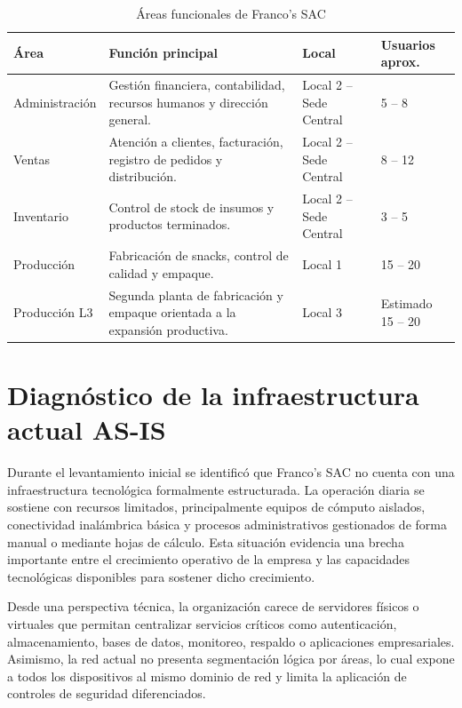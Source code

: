 \documentclass[11pt, a4paper, oneside]{report}
\begin{document}
\begin{table}[htbp]
\centering
\caption{Áreas funcionales de Franco's SAC}
\small
\renewcommand{\arraystretch}{1.25}
\begin{tabularx}{\textwidth}{|M{3.2cm}|X|L{3cm}|N{1.8cm}|}
\hline
{}
\textbf{Área} & \textbf{Función principal} & \textbf{Local} & \textbf{Usuarios aprox.} \\
\hline
Administración & Gestión financiera, contabilidad, recursos humanos y dirección general. & Local 2 -- Sede Central & 5 -- 8 \\
\hline
Ventas & Atención a clientes, facturación, registro de pedidos y distribución. & Local 2 -- Sede Central & 8 -- 12 \\
\hline
Inventario & Control de stock de insumos y productos terminados. & Local 2 -- Sede Central & 3 -- 5 \\
\hline
Producción & Fabricación de snacks, control de calidad y empaque. & Local 1 & 15 -- 20 \\
\hline
Producción L3 & Segunda planta de fabricación y empaque orientada a la expansión productiva. & Local 3 & Estimado 15 -- 20 \\
\hline
\end{tabularx}
\end{table}

\section{Diagnóstico de la infraestructura actual AS-IS}
Durante el levantamiento inicial se identificó que Franco's SAC no cuenta con una infraestructura tecnológica formalmente estructurada. La operación diaria se sostiene con recursos limitados, principalmente equipos de cómputo aislados, conectividad inalámbrica básica y procesos administrativos gestionados de forma manual o mediante hojas de cálculo. Esta situación evidencia una brecha importante entre el crecimiento operativo de la empresa y las capacidades tecnológicas disponibles para sostener dicho crecimiento.

Desde una perspectiva técnica, la organización carece de servidores físicos o virtuales que permitan centralizar servicios críticos como autenticación, almacenamiento, bases de datos, monitoreo, respaldo o aplicaciones empresariales. Asimismo, la red actual no presenta segmentación lógica por áreas, lo cual expone a todos los dispositivos al mismo dominio de red y limita la aplicación de controles de seguridad diferenciados.
\end{document}
